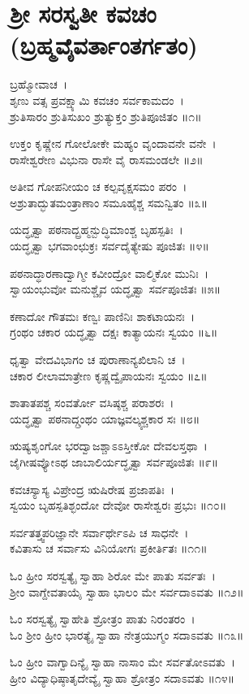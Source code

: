 \section{ಶ್ರೀ ಸರಸ್ವತೀ ಕವಚಂ \\(ಬ್ರಹ್ಮವೈವರ್ತಾಂತರ್ಗತಂ)}
ಬ್ರಹ್ಮೋವಾಚ~।\\
ಶೃಣು ವತ್ಸ ಪ್ರವಕ್ಷ್ಯಾಮಿ ಕವಚಂ ಸರ್ವಕಾಮದಂ~।\\
ಶ್ರುತಿಸಾರಂ ಶ್ರುತಿಸುಖಂ ಶ್ರುತ್ಯುಕ್ತಂ ಶ್ರುತಿಪೂಜಿತಂ ॥೧॥

ಉಕ್ತಂ ಕೃಷ್ಣೇನ ಗೋಲೋಕೇ ಮಹ್ಯಂ ವೃಂದಾವನೇ ವನೇ~।\\
ರಾಸೇಶ್ವರೇಣ ವಿಭುನಾ ರಾಸೇ ವೈ ರಾಸಮಂಡಲೇ ॥೨॥

ಅತೀವ ಗೋಪನೀಯಂ ಚ ಕಲ್ಪವೃಕ್ಷಸಮಂ ಪರಂ~।\\
ಅಶ್ರುತಾದ್ಭುತಮಂತ್ರಾಣಾಂ ಸಮೂಹೈಶ್ಚ ಸಮನ್ವಿತಂ ॥೩॥

ಯದ್ಧೃತ್ವಾ ಪಠನಾದ್ಬ್ರಹ್ಮನ್ಬುದ್ಧಿಮಾಂಶ್ಚ ಬೃಹಸ್ಪತಿಃ~।\\
ಯದ್ಧೃತ್ವಾ ಭಗವಾಂಛುಕ್ರಃ ಸರ್ವದೈತ್ಯೇಷು ಪೂಜಿತಃ ॥೪॥

ಪಠನಾದ್ಧಾರಣಾದ್ವಾಗ್ಮೀ ಕವೀಂದ್ರೋ ವಾಲ್ಮಿಕೋ ಮುನಿಃ~।\\
ಸ್ವಾಯಂಭುವೋ ಮನುಶ್ಚೈವ ಯದ್ಧೃತ್ವಾ ಸರ್ವಪೂಜಿತಃ ॥೫॥

ಕಣಾದೋ ಗೌತಮಃ ಕಣ್ವಃ ಪಾಣಿನಿಃ ಶಾಕಟಾಯನಃ~।\\
ಗ್ರಂಥಂ ಚಕಾರ ಯದ್ಧೃತ್ವಾ ದಕ್ಷಃ ಕಾತ್ಯಾಯನಃ ಸ್ವಯಂ ॥೬॥

ಧೃತ್ವಾ ವೇದವಿಭಾಗಂ ಚ ಪುರಾಣಾನ್ಯಖಿಲಾನಿ ಚ~।\\
ಚಕಾರ ಲೀಲಾಮಾತ್ರೇಣ ಕೃಷ್ಣದ್ವೈಪಾಯನಃ ಸ್ವಯಂ ॥೭॥

ಶಾತಾತಪಶ್ಚ ಸಂವರ್ತೋ ವಸಿಷ್ಠಶ್ಚ ಪರಾಶರಃ~।\\
ಯದ್ಧೃತ್ವಾ ಪಠನಾದ್ಗ್ರಂಥಂ ಯಾಜ್ಞವಲ್ಕ್ಯಶ್ಚಕಾರ ಸಃ ॥೮॥

ಋಷ್ಯಶೃಂಗೋ ಭರದ್ವಾಜಶ್ಚಾಽಽಸ್ತೀಕೋ ದೇವಲಸ್ತಥಾ~।\\
ಜೈಗೀಷವ್ಯೋಽಥ ಜಾಬಾಲಿರ್ಯದ್ಧೃತ್ವಾ ಸರ್ವಪೂಜಿತಃ ॥೯॥

ಕವಚಸ್ಯಾಸ್ಯ ವಿಪ್ರೇಂದ್ರ ಋಷಿರೇಷ ಪ್ರಜಾಪತಿಃ~।\\
ಸ್ವಯಂ ಬೃಹಸ್ಪತಿಶ್ಛಂದೋ ದೇವೋ ರಾಸೇಶ್ವರಃ ಪ್ರಭುಃ ॥೧೦॥

ಸರ್ವತತ್ತ್ವಪರಿಜ್ಞಾನೇ ಸರ್ವಾರ್ಥೇಽಪಿ ಚ ಸಾಧನೇ~।\\
ಕವಿತಾಸು ಚ ಸರ್ವಾಸು ವಿನಿಯೋಗಃ ಪ್ರಕೀರ್ತಿತಃ ॥೧೧॥

ಓಂ ಹ್ರೀಂ ಸರಸ್ವತ್ಯೈ ಸ್ವಾಹಾ ಶಿರೋ ಮೇ ಪಾತು ಸರ್ವತಃ~।\\
ಶ್ರೀಂ ವಾಗ್ದೇವತಾಯೈ ಸ್ವಾಹಾ ಭಾಲಂ ಮೇ ಸರ್ವದಾಽವತು ॥೧೨॥

ಓಂ ಸರಸ್ವತ್ಯೈ ಸ್ವಾಹೇತಿ ಶ್ರೋತ್ರಂ ಪಾತು ನಿರಂತರಂ~।\\
ಓಂ ಶ್ರೀಂ ಹ್ರೀಂ ಭಾರತ್ಯೈ ಸ್ವಾಹಾ ನೇತ್ರಯುಗ್ಮಂ ಸದಾಽವತು ॥೧೩॥

ಓಂ ಹ್ರೀಂ ವಾಗ್ವಾದಿನ್ಯೈ ಸ್ವಾಹಾ ನಾಸಾಂ ಮೇ ಸರ್ವತೋಽವತು~।\\
ಹ್ರೀಂ ವಿದ್ಯಾಧಿಷ್ಠಾತೃದೇವ್ಯೈ ಸ್ವಾಹಾ ಶ್ರೋತ್ರಂ ಸದಾಽವತು ॥೧೪॥

